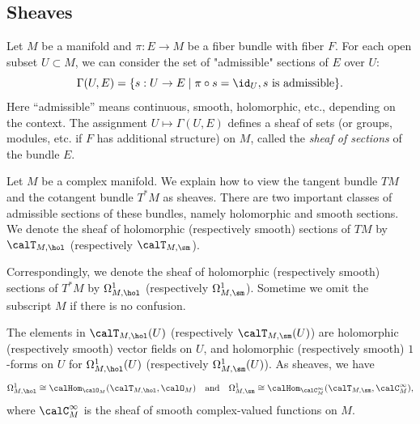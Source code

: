 \subsection{Sheaves}


    \begin{construction}\label{cons:sheaf_of_sections_of_bundle}
        Let \(M\) be a manifold and \(\pi: E \to M\) be a fiber bundle with fiber \(F\).
        For each open subset \(U \subset M\), we can consider the set of "admissible" sections of \(E\) over \(U\):
        \[
            \Gamma(U,E) = \{ s: U \to E \mid \pi \circ s = \id_U, s \text{ is admissible} \}.
        \]
        Here ``admissible'' means continuous, smooth, holomorphic, etc., depending on the context.
        The assignment \(U \mapsto \Gamma(U,E)\) defines a sheaf of sets (or groups, modules, etc. if \(F\) has additional structure) on \(M\), called the \emph{sheaf of sections} of the bundle \(E\).
    \end{construction}

    \begin{example}\label{eg:tangent_and_cotangent_bundle_as_sheaves}
        Let \(M\) be a complex manifold.
        We explain how to view the tangent bundle \(TM\) and the cotangent bundle \(T^*M\) as sheaves.
        There are two important classes of admissible sections of these bundles, namely holomorphic and smooth sections.
        We denote the sheaf of holomorphic (respectively smooth) sections of \(TM\) by \(\calT_{M,\hol}\) (respectively \(\calT_{M,\sm}\)).

        Correspondingly, we denote the sheaf of holomorphic (respectively smooth) sections of \(T^*M\) by \(\Omega_{M,\hol}^1\) (respectively \(\Omega_{M,\sm}^1\)).
        Sometime we omit the subscript \(M\) if there is no confusion.


        The elements in \(\calT_{M,\hol}(U)\) (respectively \(\calT_{M,\sm}(U)\)) are holomorphic (respectively smooth) vector fields on \(U\),
        and holomorphic (respectively smooth) \(1\)-forms on \(U\) for \(\Omega_{M,\hol}^1(U)\) (respectively \(\Omega_{M,\sm}^1(U)\)).
        As sheaves, we have
        \[ \Omega_{M,\hol}^1 \cong \calHom_{\calO_M}(\calT_{M,\hol}, \calO_M) \quad \text{and} \quad \Omega_{M,\sm}^1 \cong \calHom_{\calC_M^\infty}(\calT_{M,\sm}, \calC_M^\infty), \]
        where \(\calC_M^\infty\) is the sheaf of smooth complex-valued functions on \(M\).
    \end{example}

